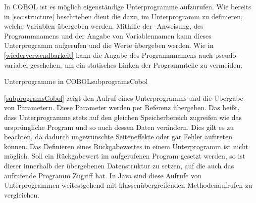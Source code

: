 In COBOL ist es möglich eigenständige Unterprogramme aufzurufen. Wie bereits in \autoref{sec:structure} beschrieben dient die  dazu, im Unterprogramm zu definieren, welche Variablen übergeben werden. Mithilfe der -Anweisung, des Programmnamens und der Angabe von Variablennamen kann dieses Unterprogramm aufgerufen und die Werte übergeben werden. Wie in \autoref{wiederverwendbarkeit} kann die Angabe des Programmnamens auch pseudo-variabel geschehen, um ein statisches Linken der Programmteile zu vermeiden. 

\begin{codeWithCaption}{Unterprogramme in COBOL}{subprogramsCobol}
\end{codeWithCaption}

\autoref{subprogramsCobol} zeigt den Aufruf eines Unterprogramms und die Übergabe von Parametern. Diese Parameter werden per Referenz übergeben. Das heißt, dass Unterprogramme stets auf den gleichen Speicherbereich zugreifen wie das ursprüngliche Program und so auch dessen Daten verändern. Dies gilt es zu beachten, da dadurch ungewünschte Seiteneffekte oder gar Fehler auftreten können. Das Definieren eines Rückgabewertes in einem Unterprogramm ist nicht möglich. Soll ein Rückgabewert im aufgerufenen Program gesetzt werden, so ist dieser innerhalb der übergebenen Datenstruktur zu setzen, auf die auch das aufrufende Programm Zugriff hat. In Java sind diese Aufrufe von Unterprogrammen weitestgehend mit klassenübergreifenden Methodenaufrufen zu vergleichen.